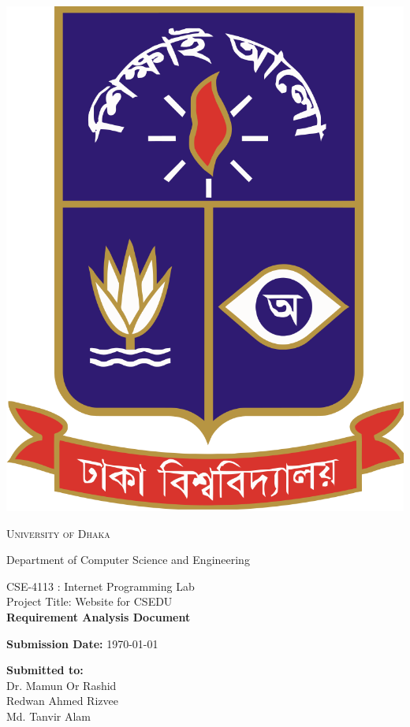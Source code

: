\documentclass[11pt]{article}
\begin{document}
\begin{titlepage}
    \begin{center}
        \includegraphics[scale=0.10]{du.png}\par
        \begin{Huge}
            \textsc{University of Dhaka}\par
        \end{Huge}
        \begin{Large}
            Department of Computer Science and Engineering\par
            \vspace{0.5cm}
            CSE-4113 : Internet Programming Lab \\[12pt]
            Project Title: Website for CSEDU \\[12pt]
            \textbf{Requirement Analysis Document}
        \end{Large}
    \end{center}
    \vfill
    \hfill \textbf{Submission Date:} \today
    \newpage
    \begin{center}
        \begin{Large}
            \textbf{Submitted to:\\[12pt]}
            Dr. Mamun Or Rashid\\
            Redwan Ahmed Rizvee\\
            Md. Tanvir Alam\\
        \end{Large}
    \end{center}


\end{titlepage}
\end{document}
